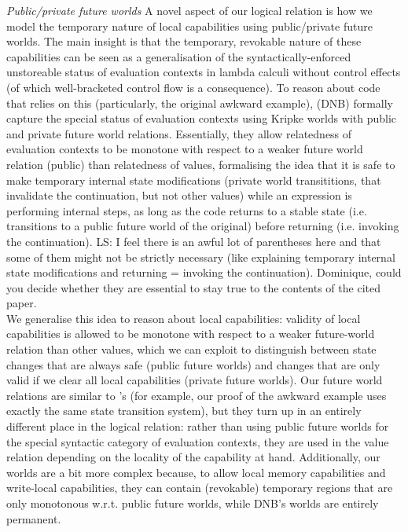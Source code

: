 \documentclass[compsoc,conference,letterpaper,fleqn]{IEEEtran}
\newcommand\lau[1]{{\color{purple} \sf \footnotesize {LS: #1}}\\}
\begin{document}
\emph{Public/private future worlds} A novel aspect of our logical relation is
how we model the temporary nature of local capabilities using public/private
future worlds. The main insight is that the temporary, revokable nature of these
capabilities can be seen as a generalisation of the syntactically-enforced
unstoreable status of evaluation contexts in lambda calculi without control
effects (of which well-bracketed control flow is a consequence). To reason about
code that relies on this (particularly, the original awkward example),
\citet{Dreyer:jfp12} (DNB) formally capture the special status of evaluation
contexts using Kripke worlds with public and private future world relations.
Essentially, they allow relatedness of evaluation contexts to be monotone with
respect to a weaker future world relation (public) than relatedness of values,
formalising the idea that it is safe to make temporary internal state
modifications (private world transititions, that invalidate the continuation,
but not other values) while an expression is performing internal steps, as long
as the code returns to a stable state (i.e. transitions to a public future world
of the original) before returning (i.e. invoking the continuation).\lau{I feel there is an awful lot of parentheses here and that some of them might not be strictly necessary (like explaining temporary internal state modifications and returning = invoking the continuation). Dominique, could you decide whether they are essential to stay true to the contents of the cited paper.}
We
generalise this idea to reason about local capabilities: validity of local
capabilities is allowed to be monotone with respect to a weaker future-world
relation than other values, which we can exploit to distinguish between state
changes that are always safe (public future worlds) and changes that are only
valid if we clear all local capabilities (private future worlds). Our future
world relations are similar to \citet{Dreyer:jfp12}'s (for example, our proof of
the awkward example uses exactly the same state transition system),
but they turn up in an entirely different place in the logical relation: rather
than using public future worlds for the special syntactic category of evaluation
contexts, they are used in the value relation depending on the
locality of the capability at hand. Additionally, our worlds are a bit more
complex because, to allow local memory capabilities and write-local
capabilities, they can contain (revokable) temporary regions that are only
monotonous w.r.t. public future worlds, while DNB's worlds are entirely
permanent.
\end{document}
